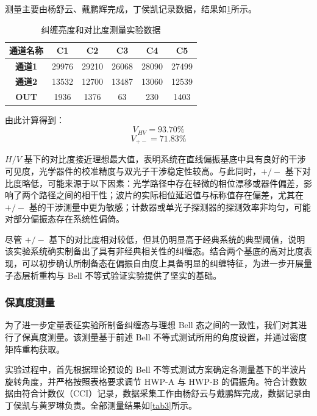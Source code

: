 测量主要由杨舒云、戴鹏辉完成，丁侯凯记录数据，结果如\cref{tab2}所示。

\begin{table}[h!]
	\centering
	\begin{tabular}{|c|c|c|c|c|c|}
		\hline
		\textbf{通道名称} & \textbf{C1} & \textbf{C2} & \textbf{C3} & \textbf{C4} & \textbf{C5} \\ \hline
		\textbf{通道1} & 29976 & 29210 & 26068 & 28090 & 27499 \\ \hline
		\textbf{通道2} & 13532 & 12700 & 13487 & 13060 & 12539 \\ \hline
		\textbf{OUT} & 1936 & 1376 & 63 & 230 & 1403 \\ \hline
	\end{tabular}
	\caption{纠缠亮度和对比度测量实验数据}
	\label{tab2}
\end{table}

由此计算得到：
$$ V_{HV} = 93.70\% $$
$$ V_{+-} = 71.83 \% $$

$H/V$ 基下的对比度接近理想最大值，表明系统在直线偏振基底中具有良好的干涉可见度，光学器件的校准精度与双光子干涉稳定性较高。与此同时，$+/-$ 基下对比度略低，可能来源于以下因素：光学路径中存在轻微的相位漂移或器件偏差，影响了两个路径之间的相干性；波片的实际相位延迟值与标称值存在偏差，尤其在 $+/-$ 基的干涉测量中更为敏感；计数器或单光子探测器的探测效率非均匀，可能对部分偏振态存在系统性偏倚。

尽管 $+/-$ 基下的对比度相对较低，但其仍明显高于经典系统的典型阈值，说明该实验系统确实制备出了具有非经典相关性的纠缠态。结合两个基底的高对比度表现，可以初步确认所制备态在偏振自由度上具备明显的纠缠特征，为进一步开展量子态层析重构与 Bell 不等式验证实验提供了坚实的基础。

\subsubsection{保真度测量}
为了进一步定量表征实验所制备纠缠态与理想 Bell 态之间的一致性，我们对其进行了保真度测量。该测量基于前述 Bell 不等式测试所用的角度设置，并通过密度矩阵重构获取。

实验过程中，首先根据理论预设的 Bell 不等式测试方案确定各测量基下的半波片旋转角度，并严格按照表格要求调节 HWP-A 与 HWP-B 的偏振角。符合计数数据由符合计数仪（CCI）记录，数据采集工作由杨舒云与戴鹏辉完成，数据记录由丁侯凯与黄罗琳负责。全部测量结果如\cref{tab3}所示。

